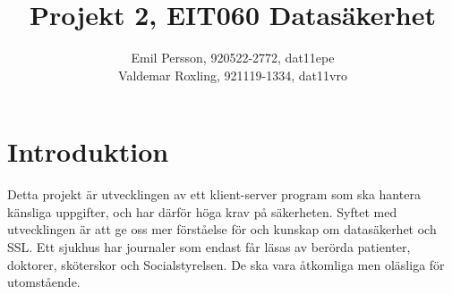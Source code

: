 \documentclass[titlepage,a4paper]{article}
\title{Projekt 2, EIT060 Datasäkerhet}
\author{Emil Persson, 920522-2772, dat11epe\\
Valdemar Roxling, 921119-1334, dat11vro}
\begin{document}
\maketitle

\tableofcontents

\newpage

\section{Introduktion}
 Detta projekt är utvecklingen av ett klient-server program som ska hantera känsliga uppgifter, och har därför höga krav på säkerheten. Syftet med utvecklingen är att ge oss mer förståelse för och kunskap om datasäkerhet och SSL. Ett sjukhus har journaler som endast får läsas av berörda patienter, doktorer, sköterskor och Socialstyrelsen. De ska vara åtkomliga men oläsliga för utomstående.
\end{document}
